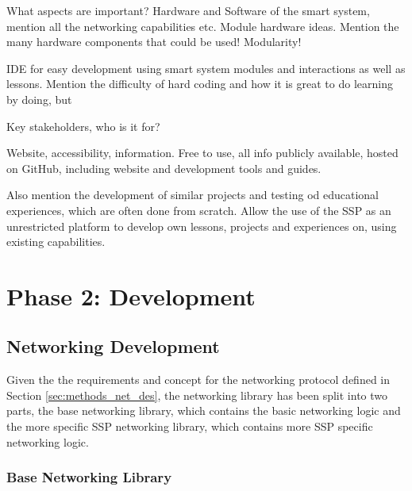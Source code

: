 What aspects are important? Hardware and Software of the smart system, mention all the networking capabilities etc. Module hardware ideas. Mention the many hardware components that could be used! Modularity!

IDE for easy development using smart system modules and interactions as well as lessons. Mention the difficulty of hard coding and how it is great to do learning by doing, but 

Key stakeholders, who is it for?

Website, accessibility, information. Free to use, all info publicly available, hosted on GitHub, including website and development tools and guides.

Also mention the development of similar projects and testing od educational experiences, which are often done from scratch. Allow the use of the SSP as an unrestricted platform to develop own lessons, projects and experiences on, using existing capabilities. 

\section{\label{sec:methods_ph2}Phase 2: Development}

\subsection{\label{sec:methods_net_dev}Networking Development}


Given the the requirements and concept for the networking protocol defined in Section \ref{sec:methods_net_des}, the networking library has been split into two parts, the base networking library, which contains the basic networking logic and the more specific SSP networking library, which contains more SSP specific networking logic.

\subsubsection{\label{sec:methods_networking}Base Networking Library}


